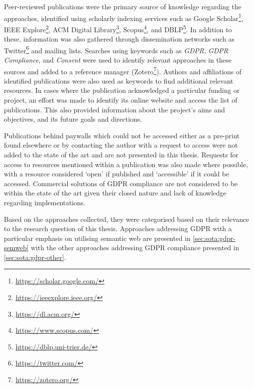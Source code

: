 Peer-reviewed publications were the primary source of knowledge regarding the approaches, identified using scholarly indexing services such as Google Scholar\footnote{\url{https://scholar.google.com/}}, IEEE Explore\footnote{\url{https://ieeexplore.ieee.org/}}, ACM Digital Library\footnote{\url{https://dl.acm.org/}}, Scopus\footnote{\url{https://www.scopus.com/}}, and DBLP\footnote{\url{https://dblp.uni-trier.de/}}.
In addition to these, information was also gathered through dissemination networks such as Twitter\footnote{\url{https://twitter.com/}} and mailing lists.
Searches using keywords such as \textit{GDPR}, \textit{GDPR Compliance}, and \textit{Consent} were used to identify relevant approaches in these sources and added to a reference manager (Zotero\footnote{\url{https://zotero.org/}}).
Authors and affiliations of identified publications were also used as keywords to find additional relevant resources.
In cases where the publication acknowledged a particular funding or project, an effort was made to identify its online website and access the list of publications. This also provided information about the project's aims and objectives, and its future goals and directions. 

Publications behind paywalls which could not be accessed either as a pre-print found elsewhere or by contacting the author with a request to access were not added to the state of the art and are not presented in this thesis. Requests for access to resources mentioned within a publication was also made where possible, with a resource considered `open' if published and `accessible' if it could be accessed. Commercial solutions of GDPR compliance are not considered to be within the state of the art given their closed nature and lack of knowledge regarding implementations.

Based on the approaches collected, they were categorised based on their relevance to the research question of this thesis.
Approaches addressing GDPR with a particular emphasis on utilising semantic web are presented in \autoref{sec:sota:gdpr-semweb} with the other approaches addressing GDPR compliance presented in \autoref{sec:sota:gdpr-other}.

